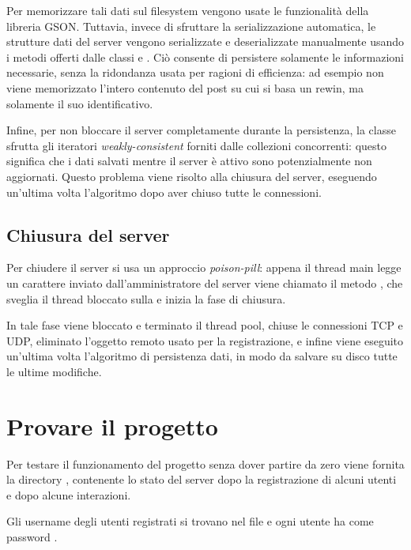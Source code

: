 \documentclass[
    oneside,
    10pt,
    language=italian,
    a4paper,
    article
]{notes}
\begin{document}
Per memorizzare tali dati sul filesystem vengono usate le funzionalità della libreria
GSON. Tuttavia, invece di sfruttare la serializzazione automatica, le strutture
dati del server vengono serializzate e deserializzate manualmente usando i metodi 
offerti dalle classi  e . 
Ciò consente di persistere solamente le informazioni necessarie, senza la
ridondanza usata per ragioni di efficienza: ad esempio non viene memorizzato 
l'intero contenuto del post su cui si basa un rewin, ma solamente il suo identificativo.

Infine, per non bloccare il server completamente durante la persistenza, la classe
 sfrutta gli iteratori \emph{weakly-consistent} forniti
dalle collezioni concorrenti: questo significa che i dati salvati mentre il server
è attivo sono potenzialmente non aggiornati.
Questo problema viene risolto alla chiusura del server, eseguendo un'ultima volta
l'algoritmo dopo aver chiuso tutte le connessioni.

\subsection{Chiusura del server}
Per chiudere il server si usa un approccio \emph{poison-pill}: appena il thread
main legge un carattere inviato dall'amministratore del server viene chiamato
il metodo , che sveglia il thread bloccato sulla 
e inizia la fase di chiusura.

In tale fase viene bloccato e terminato il thread pool, chiuse le connessioni TCP
e UDP, eliminato l'oggetto remoto usato per la registrazione, e infine viene
eseguito un'ultima volta l'algoritmo di persistenza dati, in modo da salvare
su disco tutte le ultime modifiche.

\section{Provare il progetto}
Per testare il funzionamento del progetto senza dover partire da zero viene
fornita la directory , contenente lo stato del
server dopo la registrazione di alcuni utenti e dopo alcune interazioni.

Gli username degli utenti registrati si trovano nel file 
 e ogni utente ha come password 
.
\end{document}
